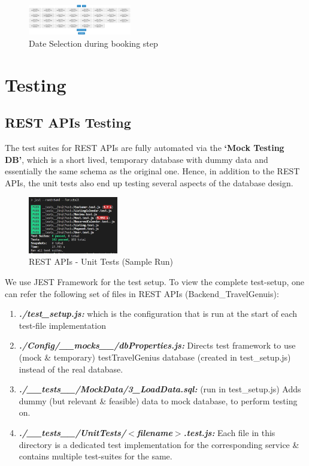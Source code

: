 \documentclass[conference]{IEEEtran}
\begin{document}
{    \begin{figure}[!h]
        \includegraphics[width=0.4\textwidth]{../Directly_As_Images/booking_step.png}
        \caption{Date Selection during booking step} \label{date_selection}
    \end{figure}
    

\section{\textbf{Testing}}
    \subsection{\textbf{REST APIs Testing}}
        The test suites for REST APIs are fully automated via the \textbf{‘Mock Testing DB’}, which is a short lived, temporary database with dummy data and essentially the same schema as the original one. Hence, in addition to the REST APIs, the unit tests also end up testing several aspects of the database design.

	\begin{figure}[!h]
            \centering
            \includegraphics[width=0.35\textwidth]{../Directly_As_Images/REST_API_UnitTests.JPG}
            \caption{REST APIs - Unit Tests (Sample Run)} \label{fig_6}
        \end{figure}

        We use JEST Framework for the test setup. To view the complete test-setup, one can refer the following set of files in REST APIs (Backend\_TravelGenuis):
        \begin{enumerate}
            \item \textit{\textbf{./test\_setup.js:}}  which is the configuration that is run at the start of each test-file implementation
            \item \textit{\textbf{./Config/\_\_mocks\_\_/dbProperties.js:}}   Directs test framework to use (mock \& temporary) testTravelGenius database (created in test\_setup.js) instead of the real database.
            \item \textit{\textbf{./\_\_tests\_\_/MockData/3\_LoadData.sql:}}   (run in test\_setup.js)  Adds dummy (but relevant \& feasible) data to mock database, to perform testing on.
            \item \textit{\textbf{./\_\_tests\_\_/UnitTests/$<$filename$>$.test.js:}}  Each file in this directory is a dedicated test implementation for the corresponding service \& contains multiple test-suites for the same.
        \end{enumerate}
        
}
\end{document}
